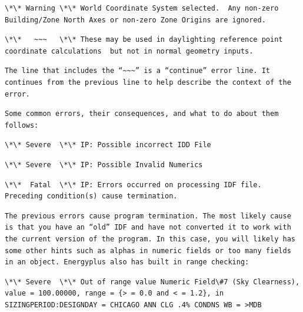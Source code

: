 \begin{lstlisting}
\*\* Warning \*\* World Coordinate System selected.  Any non-zero Building/Zone North Axes or non-zero Zone Origins are ignored.
\end{lstlisting}

\begin{lstlisting}
\*\*   ~~~   \*\* These may be used in daylighting reference point coordinate calculations  but not in normal geometry inputs.
\end{lstlisting}

\begin{lstlisting}
The line that includes the “~~~” is a “continue” error line. It continues from the previous line to help describe the context of the error.
\end{lstlisting}

\begin{lstlisting}
Some common errors, their consequences, and what to do about them follows:
\end{lstlisting}

\begin{lstlisting}
\*\* Severe  \*\* IP: Possible incorrect IDD File
\end{lstlisting}

\begin{lstlisting}
\*\* Severe  \*\* IP: Possible Invalid Numerics
\end{lstlisting}

\begin{lstlisting}
\*\*  Fatal  \*\* IP: Errors occurred on processing IDF file. Preceding condition(s) cause termination.
\end{lstlisting}

\begin{lstlisting}
The previous errors cause program termination. The most likely cause is that you have an “old” IDF and have not converted it to work with the current version of the program. In this case, you will likely has some other hints such as alphas in numeric fields or too many fields in an object. Energyplus also has built in range checking:
\end{lstlisting}

\begin{lstlisting}
\*\* Severe  \*\* Out of range value Numeric Field\#7 (Sky Clearness), value = 100.00000, range = {> = 0.0 and < = 1.2}, in SIZINGPERIOD:DESIGNDAY = CHICAGO ANN CLG .4% CONDNS WB = >MDB
\end{lstlisting}


